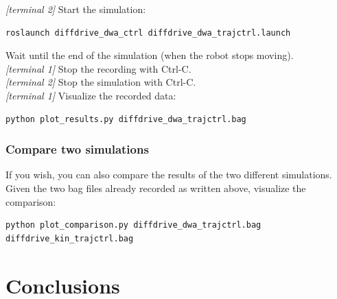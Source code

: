 \documentclass[11pt,a4paper]{article}
\begin{document}
\textit{[terminal 2]} Start the simulation:
\begin{lstlisting}
roslaunch diffdrive_dwa_ctrl diffdrive_dwa_trajctrl.launch
\end{lstlisting}

Wait until the end of the simulation (when the robot stops moving).\\

\textit{[terminal 1]} Stop the recording with Ctrl-C.\\

\textit{[terminal 2]} Stop the simulation with Ctrl-C.\\

\textit{[terminal 1]} Visualize the recorded data:
\begin{lstlisting}
python plot_results.py diffdrive_dwa_trajctrl.bag
\end{lstlisting}

\subsubsection{Compare two simulations}

If you wish, you can also compare the results of the two different simulations.\\

Given the two bag files already recorded as written above, visualize the comparison:
\begin{lstlisting}
python plot_comparison.py diffdrive_dwa_trajctrl.bag diffdrive_kin_trajctrl.bag
\end{lstlisting}





\section{Conclusions}
\end{document}
